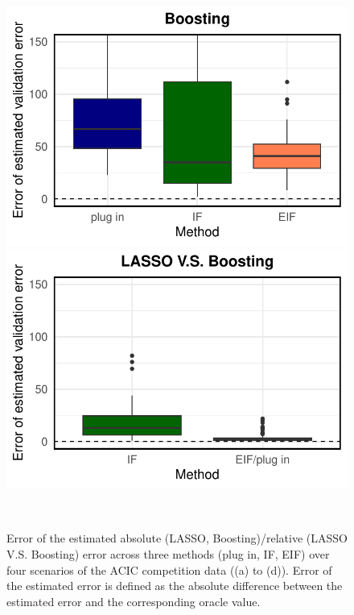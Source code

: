 \begin{figure}[ht]
\begin{minipage}{0.3\textwidth}
                \includegraphics[clip, trim = 0cm 0cm 0cm 0cm, width = \textwidth]{plot/ACIC_nonlinear_propensity_nonlinear_HTE_estimator_error_Boosting.pdf}
        \end{minipage}
        \begin{minipage}{0.3\textwidth}
                \centering
                \includegraphics[clip, trim = 0cm 0cm 0cm 0cm, width = \textwidth]{plot/ACIC_nonlinear_propensity_nonlinear_HTE_estimator_error_LASSO_V.S._Boosting.pdf}
        \end{minipage}        
         \\
       \caption{
        Error of the estimated absolute (LASSO, Boosting)/relative (LASSO V.S. Boosting) error across three methods (plug in, IF, EIF) over four scenarios of the ACIC competition data ((a) to (d)). 
        Error of the estimated error is defined as the absolute difference between the estimated error and the corresponding oracle value.
        }
    \label{fig:ACIC.error.estimated.error}
\end{figure}





